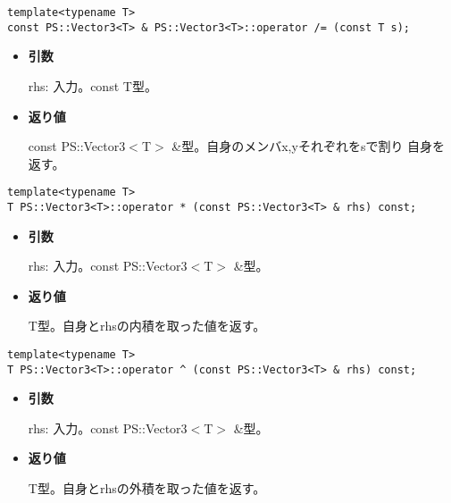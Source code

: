 \begin{screen}
\begin{verbatim}
template<typename T>
const PS::Vector3<T> & PS::Vector3<T>::operator /= (const T s);
\end{verbatim}
\end{screen}

\begin{itemize}

\item{{\bf 引数}}

{rhs}: 入力。{const T}型。

\item{{\bf 返り値}}

{const PS::Vector3$<$T$>$ \&}型。自身のメンバx,yそれぞれを{s}で割り
自身を返す。

\end{itemize}


\mbox{}

\begin{screen}
\begin{verbatim}
template<typename T>
T PS::Vector3<T>::operator * (const PS::Vector3<T> & rhs) const;
\end{verbatim}
\end{screen}

\begin{itemize}

\item{{\bf 引数}}

{rhs}: 入力。{const PS::Vector3$<$T$>$ \&}型。

\item{{\bf 返り値}}

{T}型。自身と{rhs}の内積を取った値を返す。

\end{itemize}

\begin{screen}
\begin{verbatim}
template<typename T>
T PS::Vector3<T>::operator ^ (const PS::Vector3<T> & rhs) const;
\end{verbatim}
\end{screen}

\begin{itemize}

\item{{\bf 引数}}

{rhs}: 入力。{const PS::Vector3$<$T$>$ \&}型。

\item{{\bf 返り値}}

{T}型。自身と{rhs}の外積を取った値を返す。

\end{itemize}


